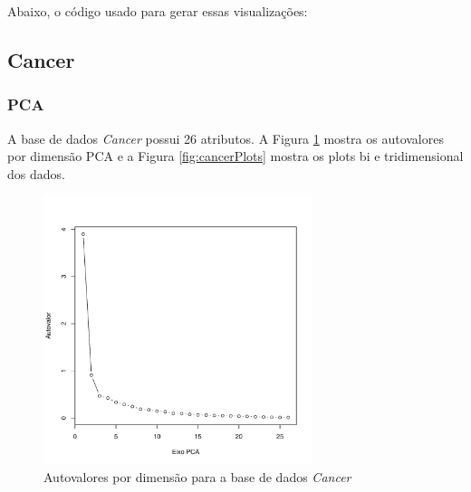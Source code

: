\documentclass[a4paper]{article}
\begin{document}
Abaixo, o código usado para gerar essas visualizações:



\newpage
\subsection{Cancer}

\subsubsection{PCA}

A base de dados \textit{Cancer} possui 26 atributos. A Figura \ref{fig:cancerAuto} mostra os autovalores por dimensão PCA e a Figura \ref{fig:cancerPlots} mostra os plots bi e tridimensional dos dados.

\begin{figure}[H]
	\centering
	\includegraphics[page=1,width=0.7\textwidth]{../cancer.pdf}
	\caption{Autovalores por dimensão para a base de dados \textit{Cancer}}
	\label{fig:cancerAuto}
\end{figure}
\end{document}
